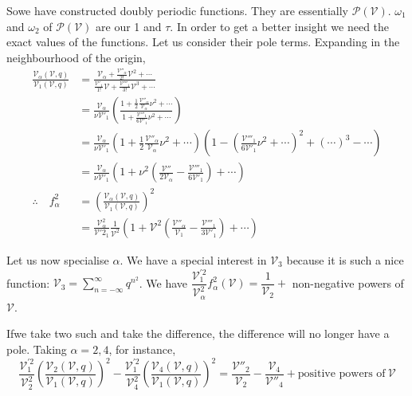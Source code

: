 So\pageoriginale we have constructed doubly periodic functions. They
are essentially $\mathscr{P}(\mathscr{V})$. $\omega_1$ and $\omega_2$
of $\mathscr{P}(\mathscr{V})$ are our 1 and $\tau$. In order to get a
better insight we need the exact values of the functions. Let us
consider their pole terms. Expanding in the neighbourhood of the
origin,
\begin{align*}
  \frac{\mathscr{V}_\alpha (\mathscr{V}, q)}{\mathscr{V}_1
    (\mathscr{V}, q)} & = \frac{\mathscr{V}_\alpha +
    \frac{\mathscr{V}''_\alpha}{2!} \mathscr{V}^2 +
    \cdots}{\frac{\mathscr{V}'_1}{1!} \mathscr{V} +
    \frac{\mathscr{V}'''_1}{3!} \mathscr{V}^3 + \cdots}\\
  & = \frac{\mathscr{V}_\alpha}{\nu \mathscr{V}'_1}\left( \frac{1+
    \frac{1}{2} \frac{\mathscr{V}''_\alpha}{\mathscr{V}_\alpha} \nu^2
    + \cdots}{1+ \frac{\mathscr{V}'''_1}{6 \mathscr{V}'_1} \nu^2 +
    \cdots}\right)\\
  & = \frac{\mathscr{V}_\alpha}{\nu \mathscr{V}'_1} \left(1+
  \frac{1}{2}\frac{\mathscr{V}''_\alpha}{\mathscr{V}_\alpha} \nu^2 +
  \cdots \right) \left( 1- \left(\frac{\mathscr{V}'''_1}{6
    \mathscr{V}'_1} \nu^2 + \cdots\right)^2 + (\cdots)^3 -
  \cdots\right)\\
  & = \frac{\mathscr{V}_\alpha}{\nu\mathscr{V}'_1} \left(1+ \nu^2
  \left(\frac{\mathscr{V}''}{2\mathscr{V}_\alpha} -
  \frac{\mathscr{V}'''_1}{6 \mathscr{V}'_1} \right) + \cdots \right)\\
  \therefore \quad f_\alpha^2 & = \left( \frac{\mathscr{V}_\alpha
    (\mathscr{V}, q)}{\mathscr{V}_1 (\mathscr{V}, q)}\right)^2\\
  & = \frac{\mathscr{V}_\alpha^2}{\mathscr{V}{'2}_1}
  \frac{1}{\mathscr{V}^2} \left( 1+ \mathscr{V}^2
  \left(\frac{\mathscr{V}''_\alpha}{\mathscr{V}_1}-
  \frac{\mathscr{V}'''_1}{3 \mathscr{V}'_1} \right) + \cdots \right) 
\end{align*}

Let us now specialise $\alpha$. We have a special interest in
$\mathscr{V}_3$ because it is such a nice function: $\mathscr{V}_3 =
\sum\limits^\infty_{n=-\infty} q^{n^2}$. We have
$\dfrac{\mathscr{V}^{'2}_1}{\mathscr{V}^2_\alpha} f_\alpha^2
(\mathscr{V}) = \dfrac{1}{\mathscr{V}_2}+$ non-negative powers of
  $\mathscr{V}$. 

If\pageoriginale we take two such and take the difference, the difference will no
longer have a pole. Taking $\alpha=2, 4$, for instance,
\begin{equation*}
  \frac{\mathscr{V}^{'2}_1}{\mathscr{V}^2_2} \left(
  \frac{\mathscr{V}_2(\mathscr{V}, q)}{\mathscr{V}_1(\mathscr{V},
    q)}\right)^2 - \frac{\mathscr{V}^{'2}_1}{\mathscr{V}^2_4}
    \left(\frac{\mathscr{V}_4 (\mathscr{V},
      q)}{\mathscr{V}_1(\mathscr{V}, q)} \right)^2=
    \frac{\mathscr{V}''_2}{\mathscr{V}_2} -
    \frac{\mathscr{V}_4}{\mathscr{V}''_4}+\text{positive powers
      of}~\mathscr{V} \tag{*}\label{part2:lec11:eq*}
\end{equation*}

